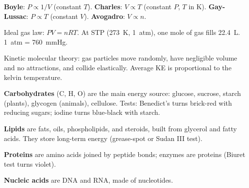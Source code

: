 \begin{gradebody}
\kf
\begin{keyfacts}
\item \textbf{Boyle}: $P \propto 1/V$ (constant $T$). \textbf{Charles}: $V \propto T$ (constant $P$, $T$ in K). \textbf{Gay-Lussac}: $P \propto T$ (constant $V$). \textbf{Avogadro}: $V \propto n$.
\item Ideal gas law: $PV = nRT$. At STP (\SI{273}{K}, \SI{1}{atm}), one mole of gas fills \SI{22.4}{L}. \SI{1}{atm} = \SI{760}{mmHg}.
\item Kinetic molecular theory: gas particles move randomly, have negligible volume and no attractions, and collide elastically. Average KE is proportional to the kelvin temperature.
\end{keyfacts}
\cards
{}

\kf
\begin{keyfacts}
\item \textbf{Carbohydrates} (C, H, O) are the main energy source: glucose, sucrose, starch (plants), glycogen (animals), cellulose. Tests: Benedict's turns brick-red with reducing sugars; iodine turns blue-black with starch.
\item \textbf{Lipids} are fats, oils, phospholipids, and steroids, built from glycerol and fatty acids. They store long-term energy (grease-spot or Sudan III test).
\item \textbf{Proteins} are amino acids joined by peptide bonds; enzymes are proteins (Biuret test turns violet).
\item \textbf{Nucleic acids} are DNA and RNA, made of nucleotides.
\end{keyfacts}
\cards
{}


\end{gradebody}
